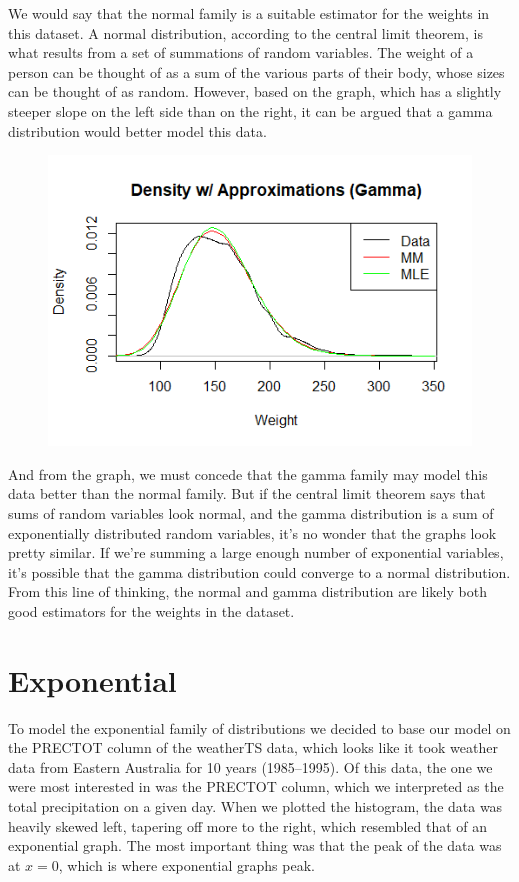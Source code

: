 \documentclass[12pt, a4paper, oneside]{report}
\begin{document}
\newpage
We would say that the normal family is a suitable estimator for the weights in this dataset. A normal distribution, according to the central limit theorem, is what results from a set of summations of random variables. The weight of a person can be thought of as a sum of the various parts of their body, whose sizes can be thought of as random. 
However, based on the graph, which has a slightly steeper slope on the left side than on the right, it can be argued that a gamma distribution would better model this data. 

\begin{figure}[h]
  \centering
  \includegraphics[width=0.7\linewidth]{normButGamma.png}
\end{figure}

And from the graph, we must concede that the gamma family may model this data better than the normal family. But if the central limit theorem says that sums of random variables look normal, and the gamma distribution is a sum of exponentially distributed random variables, it’s no wonder that the graphs look pretty similar. If we’re summing a large enough number of exponential variables, it’s possible that the gamma distribution could converge to a normal distribution. From this line of thinking, the normal and gamma distribution are likely both good estimators for the weights in the dataset.












\newpage
\section{Exponential}
To model the exponential family of distributions we decided to base our model on the PRECTOT column of the weatherTS data, which looks like it took weather data from Eastern Australia for 10 years (1985--1995).
Of this data, the one we were most interested in was the PRECTOT column, which we interpreted as the total precipitation on a given day.
When we plotted the histogram, the data was heavily skewed left, tapering off more to the right, which resembled that of an exponential graph.
The most important thing was that the peak of the data was at \(x = 0\), which is where exponential graphs peak.
\end{document}
